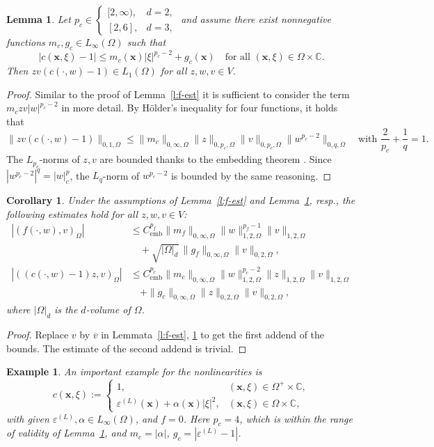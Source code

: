\documentclass[12pt,DIV=14]{scrartcl}
\newtheorem{lemma}[definition]{Lemma}
\newtheorem{example}[definition]{Example}
\newtheorem{corollary}[definition]{Corollary}
\providecommand{\eps}{\varepsilon}
\providecommand{\C}{\mathbb{C}}
\providecommand{\Om}{\Omega}
\providecommand{\vecx}{\boldsymbol{x}}
\begin{document}
\begin{lemma}\label{l:c-est}
Let $p_c\in\begin{cases}
[2,\infty), & d=2,\\
[2,6], & d=3,
\end{cases}$
and assume there exist nonnegative functions $m_c,g_c\in L_\infty(\Om)$
such that
\[
|c(\vecx,\xi)-1|\le m_c(\vecx)|\xi|^{p_c-2} + g_c(\vecx)
\quad\text{for all }
(\vecx,\xi)\in \Om\times\C.
\]
Then $zv(c(\cdot,w)-1)\in L_1(\Om)$ for all $z,w,v\in V$.
\end{lemma}
\begin{proof}
Similar to the proof of Lemma~\ref{l:f-est} it is sufficient
to consider the term $m_c z v |w|^{p_c-2}$ in more detail.
By H\"{o}lder's inequality for four functions, it holds that
\[
\|zv(c(\cdot,w)-1)\|_{0,1,\Om}
\le \|m_c\|_{0,\infty,\Om}\|z\|_{0,p_c,\Om}\|v\|_{0,p_c,\Om}\|w^{p_c-2}\|_{0,q,\Om}
\quad\text{with }
\frac{2}{p_c}+\frac{1}{q}=1.
\]
The $L_{p_c}$-norms of $z,v$ are bounded thanks to the embedding theorem \cite[Thm.~4.12]{Adams:03}.
Since $|w^{p_c-2}|^q=|w|^p_c$, the $L_q$-norm of $w^{p_c-2}$ is bounded by the same reasoning.
\end{proof}
\begin{corollary}\label{cor:cf-inequal}
Under the assumptions of Lemma~\ref{l:f-est} and Lemma~\ref{l:c-est}, resp.,
the following estimates hold for all $z,w,v\in V$:
\begin{align*}
|(f(\cdot,w),v)_\Om|
& \le C_\mathrm{emb}^{p_f}\|m_f\|_{0,\infty,\Om}\|w\|_{1,2,\Om}^{p_f-1}\|v\|_{1,2,\Om} \\
&\quad + \sqrt{|\Om|_d}\,\|g_f\|_{0,\infty,\Om}\|v\|_{0,2,\Om},\\
|((c(\cdot,w)-1)z,v)_\Om|
& \le C_\mathrm{emb}^{p_c}\|m_c\|_{0,\infty,\Om}\|w\|_{1,2,\Om}^{p_c-2}\|z\|_{1,2,\Om}\|v\|_{1,2,\Om} \\
&\quad + \|g_c\|_{0,\infty,\Om}\|z\|_{0,2,\Om}\|v\|_{0,2,\Om},
\end{align*}
where $|\Om|_d$ is the $d$-volume of $\Om$.
\end{corollary}
\begin{proof}
Replace $v$ by $\overline{v}$ in Lemmata~\ref{l:f-est}, \ref{l:c-est}
to get the first addend of the bounds.
The estimate of the second addend is trivial.
\end{proof}

\begin{example}\label{ex:Kerr}
An important example for the nonlinearities is
\[
c(\vecx,\xi) := \begin{cases}
1, & (\vecx,\xi)\in \Om^+\times\C,\\
\eps^{(L)}(\vecx) + \alpha(\vecx)|\xi|^2, & (\vecx,\xi)\in\Om\times\C,
\end{cases}
\]
with given $\eps^{(L)}, \alpha\in L_\infty(\Om)$,
and $f = 0$. Here $p_c=4$, which is within the range of validity of Lemma~\ref{l:c-est},
and $m_c=|\alpha|$, $g_c=|\eps^{(L)}-1|$.
\end{example}
\end{document}

